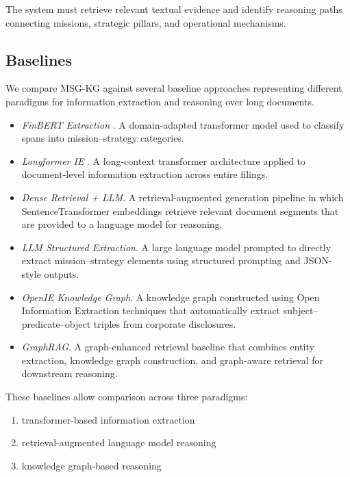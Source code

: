 \documentclass[11pt]{article}
\begin{document}
The system must retrieve relevant textual evidence and identify reasoning paths connecting missions, strategic pillars, and operational mechanisms.

\subsection{Baselines}

We compare MSG-KG against several baseline approaches representing different paradigms for information extraction and reasoning over long documents.

\begin{itemize}[leftmargin=1.0em, itemsep=0.05em, topsep=0.05em]

\item \textit{FinBERT Extraction} \cite{araci2019finbert}.  
A domain-adapted transformer model used to classify spans into mission–strategy categories.

\item \textit{Longformer IE} \cite{beltagy2020longformer}.  
A long-context transformer architecture applied to document-level information extraction across entire filings.

\item \textit{Dense Retrieval + LLM}.  
A retrieval-augmented generation pipeline in which SentenceTransformer embeddings retrieve relevant document segments that are provided to a language model for reasoning.

\item \textit{LLM Structured Extraction}.  
A large language model prompted to directly extract mission–strategy elements using structured prompting and JSON-style outputs.

\item \textit{OpenIE Knowledge Graph}.  
A knowledge graph constructed using Open Information Extraction techniques that automatically extract subject–predicate–object triples from corporate disclosures.

\item \textit{GraphRAG}.  
A graph-enhanced retrieval baseline that combines entity extraction, knowledge graph construction, and graph-aware retrieval for downstream reasoning.

\end{itemize}

These baselines allow comparison across three paradigms:

\begin{enumerate}[leftmargin=1.0em, itemsep=0.05em, topsep=0.05em]
\item transformer-based information extraction
\item retrieval-augmented language model reasoning
\item knowledge graph-based reasoning
\end{enumerate}
\end{document}
